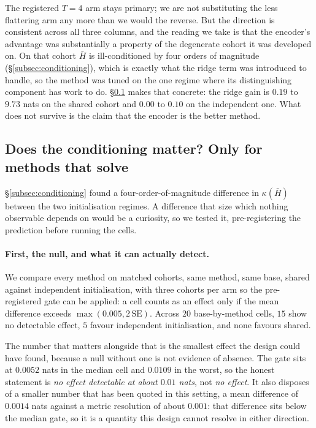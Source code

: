 The registered $T = 4$ arm stays primary; we are not substituting the less
flattering arm any more than we would the reverse. But the direction is
consistent across all three columns, and the reading we take is that the
encoder's advantage was substantially a property of the degenerate cohort
it was developed on. On that cohort $\bar H$ is ill-conditioned by four
orders of magnitude (\S\ref{subsec:conditioning}), which is exactly what
the ridge term was introduced to handle, so the method was tuned on the one
regime where its distinguishing component has work to do.
\S\ref{subsec:ridge} makes that concrete: the ridge gain is $0.19$ to
$9.73$ nats on the shared cohort and $0.00$ to $0.10$ on the independent
one. What does not survive is the claim that the encoder is the better
method.

\subsection{Does the conditioning matter? Only for methods that solve}
\label{subsec:ridge}

\S\ref{subsec:conditioning} found a four-order-of-magnitude difference in
$\kappa(\bar H)$ between the two initialisation regimes. A difference that
size which nothing observable depends on would be a curiosity, so we tested
it, pre-registering the prediction before running the cells.

\paragraph{First, the null, and what it can actually detect.} We compare
every method on matched cohorts, same method, same base, shared against
independent initialisation, with three cohorts per arm so the
pre-registered gate can be applied: a cell counts as an effect only if the
mean difference exceeds $\max(0.005, 2\,\mathrm{SE})$. Across $20$
base-by-method cells, $15$ show no detectable effect, $5$ favour
independent initialisation, and none favours shared.

The number that matters alongside that is the smallest effect the design
could have found, because a null without one is not evidence of absence.
The gate sits at $0.0052$ nats in the median cell and $0.0109$ in the
worst, so the honest statement is \emph{no effect detectable at about
$0.01$ nats}, not \emph{no effect}. It also disposes of a smaller number
that has been quoted in this setting, a mean difference of $0.0014$ nats
against a metric resolution of about $0.001$: that difference sits below
the median gate, so it is a quantity this design cannot resolve in either
direction.

